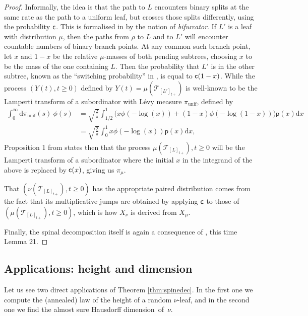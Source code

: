 \documentclass[11pt]{article}
\newcommand{\pp}{\mathsf{p}}
\newcommand{\T}{\mathcal{T}}\let\CRT\T\let\tbr\T
\newcommand{\dd}{\mathrm{d}}
\theoremstyle{definition}
\begin{document}
\begin{proof}
Informally, the idea is that the path to $L$ encounters binary splits at the same rate as the path to a uniform leaf, but crosses those splits differently, using the probability $\mathsf{c}$. This is formalised in \cite{PitmanWinkel2013} by the notion of \emph{bifurcator}. If $L'$ is a leaf with distribution $\mu$, then the paths from $\rho$ to $L$ and to $L'$ will encounter countable numbers of binary branch points. At any common such branch point, let $x$ and $1-x$ be the relative $\mu$-masses of both pending subtrees, choosing $x$ to be the mass of the one containing $L$. Then the probability that $L'$ is in the other subtree, known as the ``switching probability'' in \cite{PitmanWinkel2013}, is equal to $\mathsf{c}(1-x)$. While the process $(Y(t),t\geq 0)$ defined by $Y(t)=\mu(\T_{[L']_{t+}})$ is well-known \cite[\S 4]{bertoin2002self} to be the Lamperti transform of a subordinator with Lévy measure $\pi_{\mathrm{unif}}$, defined by
\begin{align*}
\int_{0}^{\infty} \mathrm{d} \pi_{\mathrm{unif}}(s) \ \phi(s) &= \sqrt{\frac{2}{\pi}} \int_{1/2}^{1} \bigl(x \phi(-\log (x)) + (1-x) \phi(-\log (1-x))\bigr)\pp(x)\dd x \\
&= \sqrt{\frac{2}{\pi}} \int_0^{1} x \phi(-\log (x))\pp(x)\dd x,
\end{align*}
Proposition 1 from \cite{PitmanWinkel2013} states then that the process $\mu(\T_{[L]_{t+}}),t\geq 0$ will be the Lamperti transform of a subordinator where the initial $x$ in the integrand of the above is replaced by $\mathsf{c}(x)$, giving us $\pi_\mu$.

That $(\nu(\T_{[L]_{t+}}),t\geq 0)$ has the appropriate paired distribution comes from the fact that its multiplicative jumps are obtained by applying $\mathsf{c}$ to those of $(\mu(\T_{[L]_{t+}}),t\geq 0)$, which is how $X_{\nu}$ is derived from $X_{\mu}$.

Finally, the spinal decomposition itself is again a consequence of \cite{PitmanWinkel2013}, this time Lemma 21.
\end{proof}
\subsection{Applications: height and dimension}

Let us see two direct applications of Theorem \ref{thm:spinedec}. In the first one we compute the (annealed) law of the height of a random $\nu$-leaf, and in the second one we find the almost sure Hausdorff dimension~of~$\nu$.
\end{document}
